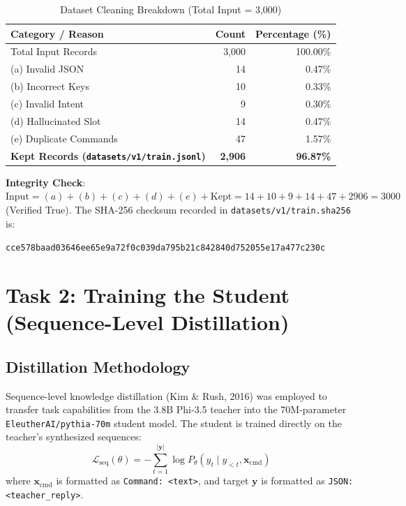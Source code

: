 \documentclass[10pt,a4paper]{article}
\begin{document}
\begin{table}[h!]
\centering
\small
\caption{Dataset Cleaning Breakdown (Total Input = 3,000)}
\begin{tabular}{lrr}
\toprule
\textbf{Category / Reason} & \textbf{Count} & \textbf{Percentage (\%)} \\
\midrule
Total Input Records & 3,000 & 100.00\% \\
(a) Invalid JSON & 14 & 0.47\% \\
(b) Incorrect Keys & 10 & 0.33\% \\
(c) Invalid Intent & 9 & 0.30\% \\
(d) Hallucinated Slot & 14 & 0.47\% \\
(e) Duplicate Commands & 47 & 1.57\% \\
\midrule
\textbf{Kept Records (\texttt{datasets/v1/train.jsonl})} & \textbf{2,906} & \textbf{96.87\%} \\
\bottomrule
\end{tabular}
\end{table}

\noindent\textbf{Integrity Check}: $\text{Input} = (a) + (b) + (c) + (d) + (e) + \text{Kept} = 14 + 10 + 9 + 14 + 47 + 2906 = 3000$ (Verified True). The SHA-256 checksum recorded in \texttt{datasets/v1/train.sha256} is:\\
\centerline{\footnotesize\texttt{cce578baad03646ee65e9a72f0c039da795b21c842840d752055e17a477c230c}}

\section{Task 2: Training the Student (Sequence-Level Distillation)}

\subsection{Distillation Methodology}
Sequence-level knowledge distillation (Kim \& Rush, 2016) was employed to transfer task capabilities from the 3.8B Phi-3.5 teacher into the 70M-parameter \texttt{EleutherAI/pythia-70m} student model. The student is trained directly on the teacher's synthesized sequences:
\begin{equation}
    \mathcal{L}_{\text{seq}}(\theta) = -\sum_{t=1}^{|\mathbf{y}|} \log P_\theta(y_t \mid y_{<t}, \mathbf{x}_{\text{cmd}})
\end{equation}
where $\mathbf{x}_{\text{cmd}}$ is formatted as \texttt{Command: <text>}, and target $\mathbf{y}$ is formatted as \texttt{JSON: <teacher\_reply>}.
\end{document}
